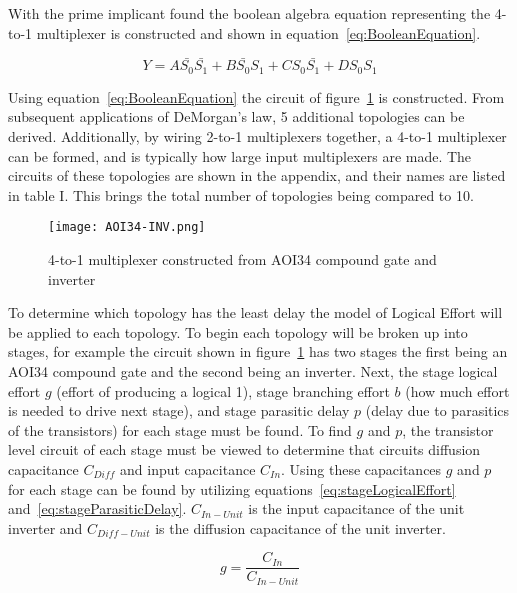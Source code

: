 \documentclass[conference]{IEEEtran}
\begin{document}
With the prime implicant found the boolean algebra equation representing the 4-to-1 multiplexer is constructed and shown in equation~\ref{eq:BooleanEquation}.


\begin{equation}
Y = A \bar{S_0} \bar{S_1} + B \bar{S_0} S_1 + C S_0 \bar{S_1} + D S_0 S_1
\label{eq:BooleanEquation}
\end{equation}

Using equation~\ref{eq:BooleanEquation} the circuit of figure~\ref{fig:AOI34-Inv} is constructed. From subsequent applications of DeMorgan's law, 5 additional topologies can be derived. Additionally, by wiring 2-to-1 multiplexers together, a 4-to-1 multiplexer can be formed, and is typically how large input multiplexers are made. The circuits of these topologies are  shown in the appendix, and their names are listed in table I. This brings the total number of topologies being compared to 10. 

       \begin{figure}[H]
       \center
          \texttt{[image: AOI34-INV.png]}
          \caption{4-to-1 multiplexer constructed from AOI34 compound gate and inverter}
          \label{fig:AOI34-Inv}
        \end{figure}

To determine which topology has the least delay the model of Logical Effort will be applied to each topology. To begin each topology will be broken up into stages, for example the circuit shown in figure~\ref{fig:AOI34-Inv}
has two stages the first being an AOI34 compound gate and the second being an inverter. Next, the stage logical effort $g$ (effort of producing a logical 1), stage branching effort $b$ (how much effort is needed to drive next stage), and stage parasitic delay $p$ (delay due to parasitics of the transistors) for each stage must be found. To find $g$ and $p$, the transistor level circuit of each stage must be viewed to determine that circuits diffusion capacitance $C_{Diff}$ and input capacitance $C_{In}$. Using these capacitances $g$ and $p$ for each stage can be found by utilizing equations~\ref{eq:stageLogicalEffort} and~\ref{eq:stageParasiticDelay}. $C_{In-Unit}$ is the input capacitance of the unit inverter and $C_{Diff-Unit}$ is the diffusion capacitance of the unit inverter. 

\begin{equation}
g = \frac{C_{In}}{C_{In-Unit}}
\label{eq:stageLogicalEffort}
\end{equation}
\end{document}
